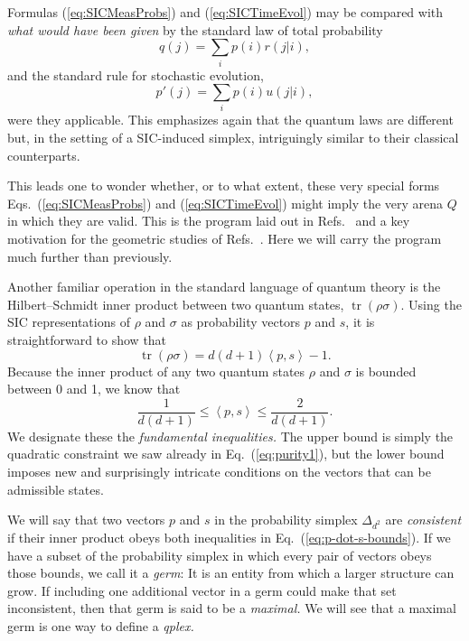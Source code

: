 \documentclass[aps,pra,superscriptaddress,10pt,tightenlines,twocolumn,nofootinbib]{revtex4}
\theoremstyle{remark}
\newcommand{\qp}{Q}
\newcommand{\inprod}[2]{{\left\langle #1 , #2 \right\rangle}}
\DeclareMathOperator{\Tr}{tr}
\begin{document}
Formulas (\ref{eq:SICMeasProbs}) and (\ref{eq:SICTimeEvol}) may be compared with {\it what would have been given\/} by the standard law of total probability
\begin{equation}
q(j) = \sum_i p(i) r(j|i),
\label{eq:ClassMeasProbs}
\end{equation}
and the standard rule for stochastic evolution,
\begin{equation}
p'(j) = \sum_i p(i) u(j|i),
\label{eq:ClassTimeEvol}
\end{equation}
were they applicable. This emphasizes again that the quantum laws are different but, in the setting of a SIC-induced simplex, intriguingly similar to their classical counterparts.

This leads one to wonder whether, or to what extent, these very special forms Eqs.\ (\ref{eq:SICMeasProbs}) and (\ref{eq:SICTimeEvol}) might imply the very arena $\qp$ in which they are valid.  This is the program laid out in Refs.\ \cite{fuchs2013,fuchs2009,Voldemort} and a key motivation for the geometric studies of Refs.\ \cite{appleby2011,appleby2011b,GroupAlg}.  Here we will carry the program much further than previously.

Another familiar operation in the standard language of quantum theory is the Hilbert--Schmidt inner product between two quantum states, $\Tr(\rho\sigma)$.  Using the SIC representations of $\rho$ and $\sigma$ as probability vectors ${p}$ and ${s}$, it is straightforward to show that
\begin{equation}
\Tr(\rho\sigma) = d(d+1) \inprod{p}{s} - 1.
\end{equation}
Because the inner product of any two quantum states $\rho$ and $\sigma$ is bounded between 0 and 1, we know that
\begin{equation}
\frac{1}{d(d+1)} \leq \inprod{p}{s}
 \leq \frac{2}{d(d+1)}.
\label{eq:p-dot-s-bounds}
\end{equation}
We designate these the \emph{fundamental inequalities.}  The upper
bound is simply the quadratic constraint we saw already in
Eq.~(\ref{eq:purity1}), but the lower bound imposes new and
surprisingly intricate conditions on the vectors that can be
admissible states.

We will say that two vectors ${p}$ and ${s}$ in the probability
simplex $\Delta_{d^2}$ are \emph{consistent} if their inner product
obeys both inequalities in Eq.~(\ref{eq:p-dot-s-bounds}).  If we have
a subset of the probability simplex in which every pair of vectors
obeys those bounds, we call it a \emph{germ}: It is an entity from
which a larger structure can grow. If including one additional vector
in a germ could make that set inconsistent, then that germ is said to
be a \emph{maximal.}  We will see that a maximal germ is one way to
define a \emph{qplex.}
\end{document}
